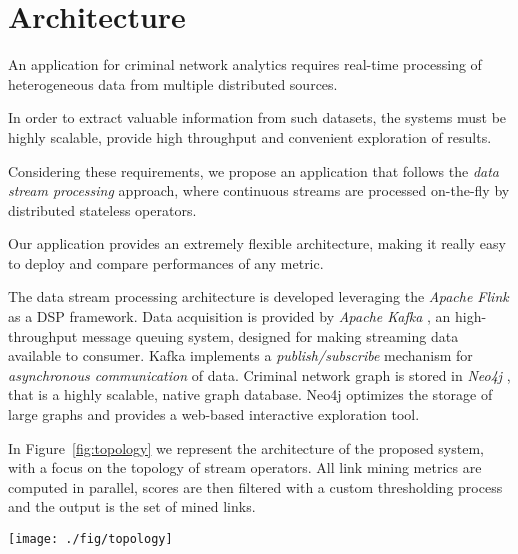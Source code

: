 \section{Architecture}
\label{sec:architecture}

An application for criminal network analytics requires real-time processing of heterogeneous data from multiple distributed sources.

In order to extract valuable information from such datasets, the systems must be highly scalable, provide high throughput and convenient exploration of results.

Considering these requirements, we propose an application that follows the \textit{data stream processing} approach, where continuous streams are processed on-the-fly by distributed stateless operators.

Our application provides an extremely flexible architecture, making it really easy to deploy and compare performances of any metric.

The data stream processing architecture is developed leveraging the \textit{Apache Flink} \cite{flink} as a DSP framework.
Data acquisition is provided by \textit{Apache Kafka} \cite{kafka}, an high-throughput message queuing system, designed for making streaming data available to consumer. Kafka implements a \textit{publish/subscribe} mechanism for \textit{asynchronous communication} of data.
Criminal network graph is stored in \textit{Neo4j} \cite{neo4j}, that is a highly scalable, native graph database. Neo4j optimizes the storage of large graphs and provides a web-based interactive exploration tool.

In Figure~\ref{fig:topology} we represent the architecture of the proposed system, with a focus on the topology of stream operators. All link mining metrics are computed in parallel, scores are then filtered with a custom thresholding process and the output is the set of mined links.

\begin{figure*}
\centering
\texttt{[image: ./fig/topology]}
\caption{The architecture.}
\label{fig:topology}
\end{figure*}

